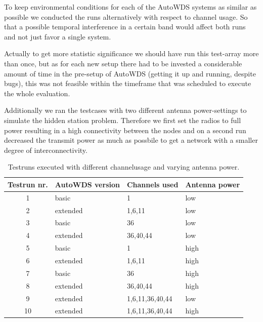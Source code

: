     To keep environmental conditions for each of the AutoWDS systems as similar as possible we conducted the runs alternatively with respect to channel usage.
    So that a possible temporal interference in a certain band would affect both runs and not just favor a single system.
  
    Actually to get more statistic significance we should have run this test-array more than once, but as for each new setup there had to 
    be invested a considerable amount of time in the pre-setup of AutoWDS (getting it up and running, despite bugs), 
    this was not feasible within the timeframe that was scheduled to execute the whole evaluation.
    
    Additionally we ran the testcases with two different antenna power-settings to simulate the hidden station problem. 
    Therefore we first set the radios to full power resulting in a high connectivity between the nodes and on a second 
    run decreased the transmit power as much as possbile to get a network with a smaller degree of interconnectivity.
  
    \begin{table}[h!]
      \centering
      \begin{tabular}{clll}
	Testrun nr. & AutoWDS version & Channels used & Antenna power\\ \hline
	1 & basic & 1 & low \\
	2 & extended & 1,6,11 & low \\
	3 & basic & 36 & low \\
	4 & extended & 36,40,44 & low \\
	5 & basic & 1 & high \\
	6 & extended & 1,6,11 & high \\
	7 & basic & 36 & high \\
	8 & extended & 36,40,44 & high \\
	9 & extended & 1,6,11,36,40,44 & low \\
	10 & extended & 1,6,11,36,40,44 & high \\
      \end{tabular}
      \caption{Testruns executed with different channelusage and varying antenna power.}
      \label{tab:testruns}
    \end{table}
    
\newpage
    
